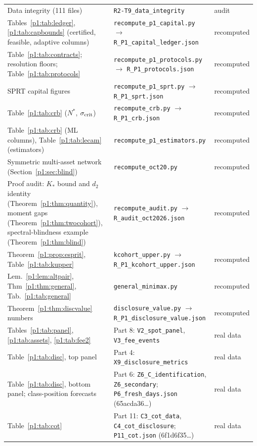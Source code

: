 \begin{longtable}{p{}p{}p{}}
Data integrity (111 files) & \texttt{R2-T9\_data\_integrity} & audit\\
Tables~\ref{p1:tab:ledger}, \ref{p1:tab:capbounds} (certified, feasible, adaptive columns) & \texttt{recompute\_p1\_capital.py} $\to$ \texttt{R\_P1\_capital\_ledger.json} & recomputed\\
Table~\ref{p1:tab:contracts}; resolution floors; Table~\ref{p1:tab:protocols} & \texttt{recompute\_p1\_protocols.py} $\to$ \texttt{R\_P1\_protocols.json} & recomputed\\
SPRT capital figures & \texttt{recompute\_p1\_sprt.py} $\to$ \texttt{R\_P1\_sprt.json} & recomputed\\
Table~\ref{p1:tab:crb} ($N^*$, $\sigma_{\rm crit}$) & \texttt{recompute\_crb.py} $\to$ \texttt{R\_P1\_crb.json} & recomputed\\
Table~\ref{p1:tab:crb} (ML columns), Table~\ref{p1:tab:lecam} (estimators) & \texttt{recompute\_p1\_estimators.py} & recomputed\\
Symmetric multi-asset network (Section~\ref{p1:sec:blind}) & \texttt{recompute\_oct20.py} & recomputed\\
Proof audit: $K_*$ bound and $d_2$ identity (Theorem~\ref{p1:thm:quantity}), moment gaps (Theorem~\ref{p1:thm:twocohort}), spectral-blindness example (Theorem~\ref{p1:thm:blind}) & \texttt{recompute\_audit.py} $\to$ \texttt{R\_audit\_oct2026.json} & recomputed\\
Theorem~\ref{p1:prop:esprit}, Table~\ref{p1:tab:kupper} & \texttt{kcohort\_upper.py} $\to$ \texttt{R\_P1\_kcohort\_upper.json} & recomputed\\
Lem.~\ref{p1:lem:altpair}, Thm~\ref{p1:thm:general}, Tab.~\ref{p1:tab:general} & \texttt{general\_minimax.py} & recomputed\\
Theorem~\ref{p1:thm:discvalue} numbers & \texttt{disclosure\_value.py} $\to$ \texttt{R\_P1\_disclosure\_value.json} & recomputed\\
Tables~\ref{p1:tab:panel}, \ref{p1:tab:assets}, \ref{p1:tab:fee2} & Part 8: \texttt{V2\_spot\_panel}, \texttt{V3\_fee\_events} & real data\\
Table~\ref{p1:tab:disc}, top panel & Part 4: \texttt{X9\_disclosure\_metrics} & real data\\
Table~\ref{p1:tab:disc}, bottom panel; class-position forecasts & Part 6: \texttt{Z6\_C\_identification}, \texttt{Z6\_secondary}; \texttt{P6\_fresh\_days.json} (65acda36\ldots) & real data\\
Table~\ref{p1:tab:cot} & Part 11: \texttt{C3\_cot\_data}, \texttt{C4\_cot\_disclosure}; \texttt{P11\_cot.json} (6f1d6f35\ldots) & real data\\

\end{longtable}
